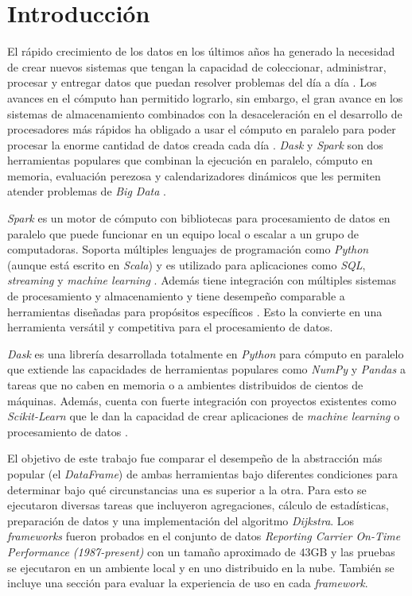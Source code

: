 \chapter*{Introducción}


\noindent El rápido crecimiento de los datos en los últimos años ha generado la necesidad de crear nuevos sistemas que tengan la capacidad de coleccionar, administrar, procesar y entregar datos que puedan resolver problemas del día a día \cite{seagate}. Los avances en el cómputo han permitido lograrlo, sin embargo, el gran avance en los sistemas de almacenamiento combinados con la desaceleración en el desarrollo de procesadores más rápidos ha obligado a usar el cómputo en paralelo para poder procesar la enorme cantidad de datos creada cada día \cite{sparkguide}. \textit{Dask} y \textit{Spark} son dos herramientas populares que combinan la ejecución en paralelo, cómputo en memoria, evaluación perezosa y calendarizadores dinámicos que les permiten atender problemas de \textit{Big Data} \cite{dask-spark-neuroimaging}.

\textit{Spark} es un motor de cómputo con bibliotecas para procesamiento de datos en paralelo que puede funcionar en un equipo local o escalar a un grupo de computadoras. Soporta múltiples lenguajes de programación como \textit{Python} (aunque está escrito en \textit{Scala}) y es utilizado para aplicaciones como \textit{SQL}, \textit{streaming} y \textit{machine learning} \cite{sparkguide}. Además tiene integración con múltiples sistemas de procesamiento y almacenamiento y tiene desempeño comparable a herramientas diseñadas para propósitos específicos \cite{sparkberkeley}. Esto la convierte en una herramienta versátil y competitiva para el procesamiento de datos. 

\textit{Dask} es una librería desarrollada totalmente en \textit{Python} para cómputo en paralelo que extiende las capacidades de herramientas populares como \textit{NumPy} y \textit{Pandas} a tareas que no caben en memoria o a ambientes distribuidos de cientos de máquinas. Además, cuenta con fuerte integración con proyectos existentes como \textit{Scikit-Learn} que le dan la capacidad de crear aplicaciones de \textit{machine learning} o procesamiento de datos \cite{daskdocs}.

El objetivo de este trabajo fue comparar el desempeño de la abstracción más popular (el \textit{DataFrame}) de ambas herramientas bajo diferentes condiciones para determinar bajo qué circunstancias una es superior a la otra. Para esto se ejecutaron diversas tareas que incluyeron agregaciones, cálculo de estadísticas, preparación de datos y una implementación del algoritmo \textit{Dijkstra}. Los \textit{frameworks} fueron probados en el conjunto de datos \textit{Reporting Carrier On-Time Performance (1987-present)} con un tamaño aproximado de 43GB y las pruebas se ejecutaron en un ambiente local y en uno distribuido en la nube. También se incluye una sección para evaluar la experiencia de uso en cada \textit{framework}.

